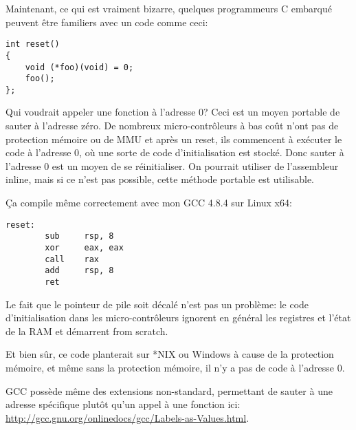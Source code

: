 Maintenant, ce qui est vraiment bizarre, quelques programmeurs C embarqué peuvent
être familiers avec un code comme ceci:

\begin{lstlisting}[style=customc]
int reset()
{
	void (*foo)(void) = 0;
	foo();
};
\end{lstlisting}

Qui voudrait appeler une fonction à l'adresse 0?
Ceci est un moyen portable de sauter à l'adresse zéro.
De nombreux micro-contrôleurs à bas coût n'ont pas de protection mémoire ou de \ac{MMU}
et après un reset, ils commencent à exécuter le code à l'adresse 0, où une sorte
de code d'initialisation est stocké.
Donc sauter à l'adresse 0 est un moyen de se réinitialiser.
On pourrait utiliser de l'assembleur inline, mais si ce n'est pas possible, cette
méthode portable est utilisable.

Ça compile même correctement avec mon GCC 4.8.4 sur Linux x64:

\begin{lstlisting}[style=customasmx86]
reset:
        sub     rsp, 8
        xor     eax, eax
        call    rax
        add     rsp, 8
        ret
\end{lstlisting}

Le fait que le pointeur de pile soit décalé n'est pas un problème: le code d'initialisation
dans les micro-contrôleurs ignorent en général les registres et l'état de la \ac{RAM}
et démarrent from scratch.

Et bien sûr, ce code planterait sur *NIX ou Windows à cause de la protection mémoire,
et même sans la protection mémoire, il n'y a pas de code à l'adresse 0.

GCC possède même des extensions non-standard, permettant de sauter à une adresse spécifique
plutôt qu'un appel à une fonction ici:
\url{http://gcc.gnu.org/onlinedocs/gcc/Labels-as-Values.html}.


